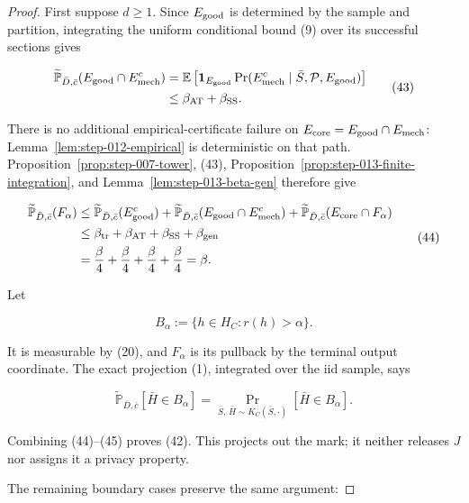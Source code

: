\begin{proof}
First suppose \(d\geq1\). Since \(E_{\rm good}\) is determined
by the sample and partition, integrating the uniform conditional bound (9)
over its successful sections gives

\[
\begin{aligned}
 \widetilde{\mathbb P}_{\bar D,\bar c}
   (E_{\rm good}\cap E_{\rm mech}^c)
 &=\mathbb E\left[
   \mathbf1_{E_{\rm good}}
   \Pr(E_{\rm mech}^c\mid\bar S,\mathcal P,E_{\rm good})
   \right]\\
 &\leq\beta_{\rm AT}+\beta_{\rm SS}.
\end{aligned}
 \tag{43}
\]

There is no additional empirical-certificate failure on
\(E_{\rm core}=E_{\rm good}\cap E_{\rm mech}\): Lemma~\ref{lem:step-012-empirical} is deterministic on that path.
Proposition~\ref{prop:step-007-tower}, (43),
Proposition~\ref{prop:step-013-finite-integration}, and
Lemma~\ref{lem:step-013-beta-gen} therefore give

\[
\begin{aligned}
 \widetilde{\mathbb P}_{\bar D,\bar c}(F_\alpha)
 &\leq
 \widetilde{\mathbb P}_{\bar D,\bar c}(E_{\rm good}^c)
 +\widetilde{\mathbb P}_{\bar D,\bar c}
    (E_{\rm good}\cap E_{\rm mech}^c)
 +\widetilde{\mathbb P}_{\bar D,\bar c}
    (E_{\rm core}\cap F_\alpha)\\
 &\leq\beta_{\rm tr}+\beta_{\rm AT}
          +\beta_{\rm SS}+\beta_{\rm gen}\\
 &=\frac\beta4+\frac\beta4+\frac\beta4+\frac\beta4=\beta.
\end{aligned}
 \tag{44}
\]

Let

\[
 B_\alpha:=\{h\in H_C:r(h)>\alpha\}.
\]

It is measurable by (20), and \(F_\alpha\) is its pullback by the terminal
output coordinate. The exact projection (1), integrated over the iid
sample, says

\[
 \widetilde{\mathbb P}_{\bar D,\bar c}
  [\bar H\in B_\alpha]
 =\Pr_{\bar S,\,\bar H\sim K_C(\bar S,\cdot)}
  [\bar H\in B_\alpha].
 \tag{45}
\]

Combining (44)--(45) proves (42). This projects out the mark; it neither
releases \(J\) nor assigns it a privacy property.

The remaining boundary cases preserve the same argument:


\end{proof}

